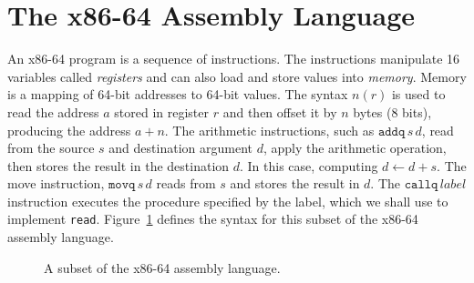 \documentclass[12pt]{book}
\newcommand{\itm}[1]{\ensuremath{\mathit{#1}}}
\newcommand{\Instr}{\itm{instr}}
\newcommand{\Prog}{\itm{prog}}
\newcommand{\Arg}{\itm{arg}}
\newcommand{\Int}{\itm{int}}
\newcommand{\key}[1]{\texttt{#1}}
\begin{document}
\section{The x86-64 Assembly Language}

An x86-64 program is a sequence of instructions. The instructions
manipulate 16 variables called \emph{registers} and can also load and
store values into \emph{memory}. Memory is a mapping of 64-bit
addresses to 64-bit values. The syntax $n(r)$ is used to read the
address $a$ stored in register $r$ and then offset it by $n$ bytes (8
bits), producing the address $a + n$. The arithmetic instructions,
such as $\key{addq}\,s\,d$, read from the source $s$ and destination
argument $d$, apply the arithmetic operation, then stores the result
in the destination $d$. In this case, computing $d \gets d + s$.  The
move instruction, $\key{movq}\,s\,d$ reads from $s$ and stores the
result in $d$. The $\key{callq}\,\mathit{label}$ instruction executes
the procedure specified by the label, which we shall use to implement
\key{read}. Figure~\ref{fig:x86-a} defines the syntax for this subset
of the x86-64 assembly language.

\begin{figure}[tbp]
\fbox{
\begin{minipage}{0.96\textwidth}
\[
\begin{array}{lcl}
\itm{register} &::=& \key{rsp} \mid \key{rbp} \mid \key{rax} \mid \key{rbx} \mid \key{rcx}
              \mid \key{rdx} \mid \key{rsi} \mid \key{rdi} \mid \\
              && \key{r8} \mid \key{r9} \mid \key{r10}
              \mid \key{r11} \mid \key{r12} \mid \key{r13}
              \mid \key{r14} \mid \key{r15} \\
\Arg &::=&  \key{\$}\Int \mid \key{\%}\itm{register} \mid \Int(\key{\%}\itm{register}) \\ 
\Instr &::=& \key{addq} \; \Arg, \Arg \mid 
      \key{subq} \; \Arg, \Arg \mid 
      \key{imulq} \; \Arg,\Arg \mid 
      \key{negq} \; \Arg \mid \\
  && \key{movq} \; \Arg, \Arg \mid 
      \key{callq} \; \mathit{label} \mid
      \key{pushq}\;\Arg \mid \key{popq}\;\Arg \mid \key{retq} \\
\Prog &::= & \key{.globl \_main}\\
      &    & \key{\_main:} \; \Instr^{+}
\end{array}
\]
\end{minipage}
}
\caption{A subset of the x86-64 assembly language.}
\label{fig:x86-a}
\end{figure}
\end{document}
